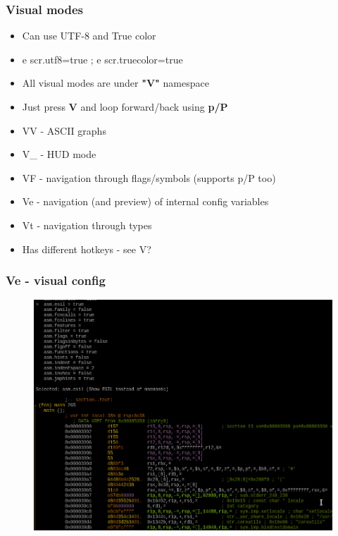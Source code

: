 \documentclass[10pt,pdf,utf8,english,compress,hyperref={unicode}]{beamer}
\begin{document}
\begin{frame}[fragile]
  \frametitle{Visual modes}
  \begin{itemize}
	  \item Can use UTF-8 and True color %
	  \item \alert{e scr.utf8=true ; e scr.truecolor=true}
	  \item All visual modes are under \textbf{"V"} namespace
	  \item Just press \textbf{V} and loop forward/back using \textbf{p/P}
	  \item \alert{VV} - ASCII graphs
	  \item \alert{V\_} - HUD mode
	  \item \alert{VF} - navigation through flags/symbols (supports p/P too)
	  \item \alert{Ve} - navigation (and preview) of internal config variables
	  \item \alert{Vt} - navigation through types
	  \item Has different hotkeys - see \alert{V?}
  \end{itemize}
\end{frame}

\begin{frame}[fragile]
	\frametitle{Ve - visual config}
	\begin{figure}
		\includegraphics[width=\linewidth]{r2visualconfig.png}
	\end{figure}
\end{frame}
\end{document}
